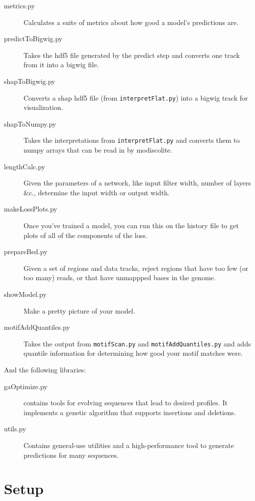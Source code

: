 \documentclass{article}
\begin{document}
\begin{description}
    \item [metrics.py] Calculates a suite of metrics about how good a model's predictions are.
    \item [predictToBigwig.py] Takes the hdf5 file generated by the predict step and converts one
        track from it into a bigwig file.
    \item [shapToBigwig.py] Converts a shap hdf5 file (from \texttt{interpretFlat.py}) into a
        bigwig track for visualization.
    \item [shapToNumpy.py] Takes the interpretations from \texttt{interpretFlat.py} and converts
        them to numpy arrays that can be read in by modiscolite.
    \item [lengthCalc.py] Given the parameters of a network, like input filter width, number of
        layers \&c., determine the input width or output width.
    \item [makeLossPlots.py] Once you've trained a model, you can run this on the history file
        to get plots of all of the components of the loss.
    \item [prepareBed.py] Given a set of regions and data tracks, reject regions that have too
        few (or too many) reads, or that have unmappped bases in the genome.
    \item [showModel.py] Make a pretty picture of your model.
    \item [motifAddQuantiles.py] Takes the output from \texttt{motifScan.py} and
        \texttt{motifAddQuantiles.py} and adds quantile information for determining how good
        your motif matches were.
\end{description}

And the following libraries:

\begin{description}
    \item [gaOptimize.py] contains tools for evolving sequences that lead to desired profiles.
        It implements a genetic algorithm that supports insertions and deletions.
    \item [utils.py] Contains general-use utilities and a high-performance tool to generate
        predictions for many sequences.
\end{description}

\newpage

\section{Setup}
\end{document}

